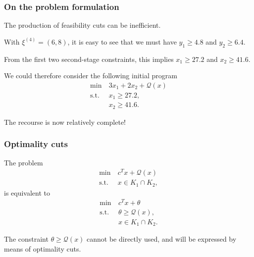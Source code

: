 \documentclass[aspectratio=169]{beamer}
\begin{document}
\begin{frame}
	\frametitle{On the problem formulation}
	
	The production of feasibility cuts can be inefficient.
	
	\mbox{}
	
	With $\xi^{(4)} = (6, 8)$, it is easy to see that we must have $y_1 \geq	4.8$ and $y_2 \geq 6.4$.
	
	\mbox{}
	
	From the first two second-stage constraints, this implies $x_1 \geq 27.2$ and $x_2 \geq 41.6$.
	
	\mbox{}
	
	We could therefore consider the following initial program
	\begin{align*}
	\min\ & 3x_1 + 2x_2 + \mathcal{Q}(x) \\
	\text{s.t. } & x_1 \geq 27.2, \\
	& x_2 \geq 41.6.
	\end{align*}
	
	The recourse is now relatively complete!
	
\end{frame}

\begin{frame}
	\frametitle{Optimality cuts}
	
	The problem
	\begin{align*}
		\min\ & c^Tx + \mathcal{Q}(x) \\
		\text{s.t. } & x \in K_1 \cap K_2,
	\end{align*}
	is equivalent to
	\begin{align*}
		\min\ & c^Tx + \theta \\
		\text{s.t. } & \theta \geq \mathcal{Q}(x), \\
		& x \in K_1 \cap K_2.
	\end{align*}
	
The constraint $\theta \geq \mathcal{Q}(x)$ cannot be directly used, and will be expressed by means of optimality cuts.

\end{frame}
\end{document}
